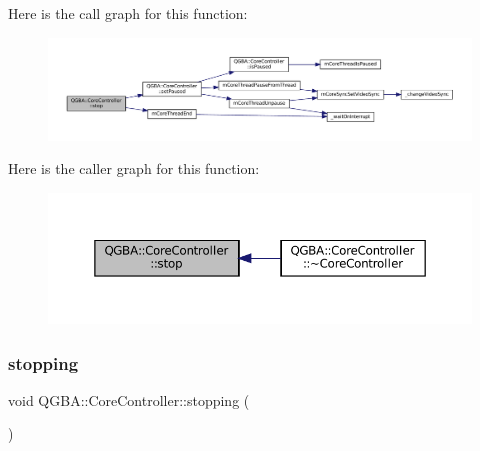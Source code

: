 Here is the call graph for this function\+:
\nopagebreak
\begin{figure}[H]
\begin{center}
\leavevmode
\includegraphics[width=350pt]{class_q_g_b_a_1_1_core_controller_a4c9b7742e703ce7377b3176446f43813_cgraph}
\end{center}
\end{figure}
Here is the caller graph for this function\+:
\nopagebreak
\begin{figure}[H]
\begin{center}
\leavevmode
\includegraphics[width=350pt]{class_q_g_b_a_1_1_core_controller_a4c9b7742e703ce7377b3176446f43813_icgraph}
\end{center}
\end{figure}
\mbox{\label{class_q_g_b_a_1_1_core_controller_a5ee41c1bdc09690c5a5a650417cddcfa}} 
\subsubsection{\texorpdfstring{stopping}{stopping}}
{\footnotesize\ttfamily void Q\+G\+B\+A\+::\+Core\+Controller\+::stopping (\begin{DoxyParamCaption}{ }\end{DoxyParamCaption})\hspace{0.3cm}{\ttfamily [signal]}}

